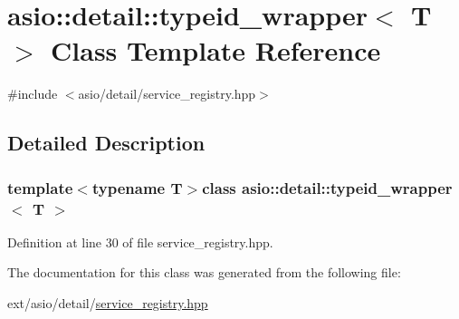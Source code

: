 \hypertarget{classasio_1_1detail_1_1typeid__wrapper}{}\section{asio\+:\+:detail\+:\+:typeid\+\_\+wrapper$<$ T $>$ Class Template Reference}
\label{classasio_1_1detail_1_1typeid__wrapper}


{\ttfamily \#include $<$asio/detail/service\+\_\+registry.\+hpp$>$}



\subsection{Detailed Description}
\subsubsection*{template$<$typename T$>$class asio\+::detail\+::typeid\+\_\+wrapper$<$ T $>$}



Definition at line 30 of file service\+\_\+registry.\+hpp.



The documentation for this class was generated from the following file\+:\begin{DoxyCompactItemize}
\item 
ext/asio/detail/\hyperlink{service__registry_8hpp}{service\+\_\+registry.\+hpp}\end{DoxyCompactItemize}
